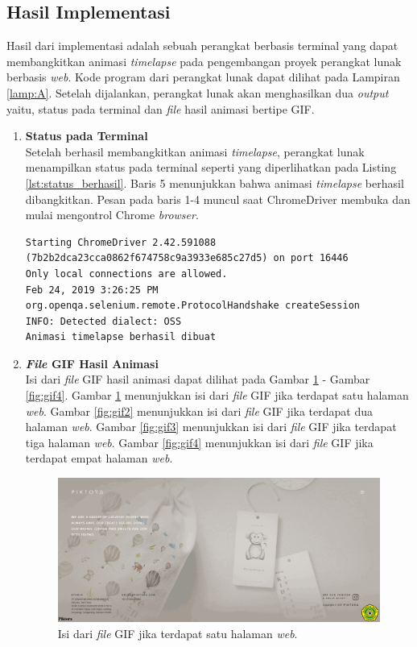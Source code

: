 \subsection{Hasil Implementasi}
\label{subsec:lingkunganimplementasi}
Hasil dari implementasi adalah sebuah perangkat berbasis terminal yang dapat membangkitkan animasi \textit{timelapse} pada pengembangan proyek perangkat lunak berbasis \textit{web}. Kode program dari perangkat lunak dapat dilihat pada Lampiran \ref{lamp:A}. Setelah dijalankan, perangkat lunak akan menghasilkan dua \textit{output} yaitu, status pada terminal dan \textit{file} hasil animasi bertipe GIF.
\begin{enumerate}
\item \textbf{Status pada Terminal}\\
Setelah berhasil membangkitkan animasi \textit{timelapse}, perangkat lunak menampilkan status pada terminal seperti yang diperlihatkan pada Listing \ref{lst:status_berhasil}. Baris 5 menunjukkan bahwa animasi \textit{timelapse} berhasil dibangkitkan. Pesan pada baris 1-4 muncul saat ChromeDriver membuka dan mulai mengontrol Chrome \textit{browser}.

\begin{lstlisting}[caption={Status pesan pada terminal saat program berhasil membangkitkan animasi \textit{timelapse}.},label={lst:status_berhasil},language=plaintext]
Starting ChromeDriver 2.42.591088 (7b2b2dca23cca0862f674758c9a3933e685c27d5) on port 16446
Only local connections are allowed.
Feb 24, 2019 3:26:25 PM org.openqa.selenium.remote.ProtocolHandshake createSession
INFO: Detected dialect: OSS
Animasi timelapse berhasil dibuat
\end{lstlisting}

\item \textbf{\textit{File} GIF Hasil Animasi}\\
Isi dari \textit{file} GIF hasil animasi dapat dilihat pada Gambar \ref{fig:gif1} - Gambar \ref{fig:gif4}. Gambar \ref{fig:gif1} menunjukkan isi dari \textit{file} GIF jika terdapat satu halaman \textit{web}. Gambar \ref{fig:gif2} menunjukkan isi dari \textit{file} GIF jika terdapat dua halaman \textit{web}. Gambar \ref{fig:gif3} menunjukkan isi dari \textit{file} GIF jika terdapat tiga halaman \textit{web}. Gambar \ref{fig:gif4} menunjukkan isi dari \textit{file} GIF jika terdapat empat halaman \textit{web}. 

\begin{figure}[H]
	\centering
		\includegraphics[scale=0.4]{Gambar/output1.png}
	\caption{Isi dari \textit{file} GIF jika terdapat satu halaman \textit{web}.}
	\label{fig:gif1}
\end{figure}


\end{enumerate}
